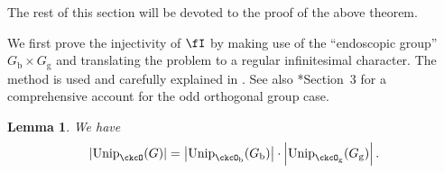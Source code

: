 \documentclass[12pt,a4paper]{amsart}
\def\abs#1{\left|{#1}\right|}
\numberwithin{equation}{section}
\newtheorem{lem}[thm]{Lemma}
\theoremstyle{remark}
\def\Unip{\mathrm{Unip}}
\def\Gb{G_{\mathrm b}}
\def\Gg{G_{\mathrm g}}
\begin{document}
%

\def\fhhaso{(\fhh^a_1)^*}
\def\fhhast{(\fhh^a_2)^*}
\newcommand{\ff}{f}
\newcommand{\ffcoh}{\varphi}

  The rest of this section will be devoted to the proof of the above theorem.

 We first prove the injectivity of $\fI$ by making use of the ``endoscopic group'' $\Gb\times \Gg$ and translating the problem to a regular infinitesimal
 character. The method is used and carefully explained in \cite{Mat}. See also
\cite{GI}*{Section~3} for a comprehensive account for the odd orthogonal group
case. %


\begin{lem}\label{lem:BGcount}
  We have
  \[
    \abs{\Unip_{\ckcO}(G)} =
    \abs{\Unip_{\ckcO_{\mathrm b}}(G_{\mathrm b})}\cdot
    \abs{\Unip_{\ckcO_{\mathrm g}}(G_{\mathrm g})}.
  \]
\end{lem}
\end{document}
